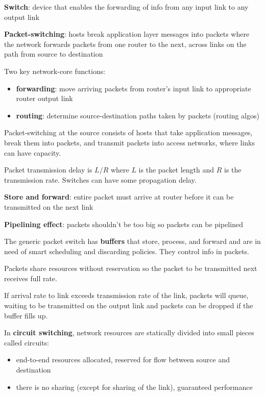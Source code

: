 \documentclass[11pt]{article}
\begin{document}
\textbf{Switch}: device that enables the forwarding of info from any input link to any output link

\textbf{Packet-switching}: hosts break application layer messages into packets where the network forwards packets
from one router to the next, across links on the path from source to destination

Two key network-core functions:
\begin{itemize}
\item \textbf{forwarding}: move arriving packets from router's input link to appropriate router output link
\item \textbf{routing}: determine source-destination paths taken by packets (routing algos)
\end{itemize}

Packet-switching at the source consists of hosts that take application messages, break them into packets,
and transmit packets into access networks, where links can have capacity.

Packet transmission delay is \(L/R\) where \(L\) is the packet length and \(R\) is the transmission rate.
Switches can have some propagation delay.

\textbf{Store and forward}: entire packet must arrive at router before it can be transmitted on the next link

\textbf{Pipelining effect}: packets shouldn't be too big so packets can be pipelined

The generic packet switch has \textbf{buffers} that store, process, and forward and are in need of smart scheduling
and discarding policies. They control info in packets.

Packets share resources without reservation so the packet to be transmitted next receives full rate.

If arrival rate to link exceeds transmission rate of the link, packets will queue, waiting to be transmitted
on the output link and packets can be dropped if the buffer fills up.

In \textbf{circuit switching}, network resources are statically divided into small pieces called circuits:
\begin{itemize}
\item end-to-end resources allocated, reserved for flow between source and destination
\item there is no sharing (except for sharing of the link), guaranteed performance
\end{itemize}
\end{document}
